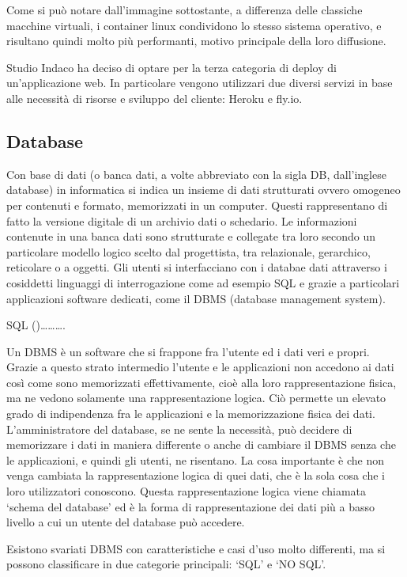 \documentclass[12pt,a4paper]{article}
\begin{document}
Come si può notare dall’immagine sottostante, a differenza delle classiche macchine virtuali, i container linux condividono lo stesso sistema operativo, e risultano quindi molto più performanti, motivo principale della loro diffusione.

Studio Indaco ha deciso di optare per la terza categoria di deploy di un’applicazione web. In particolare vengono utilizzari due diversi servizi in base alle necessità di risorse e sviluppo del cliente: Heroku e fly.io.

\subsection{Database}
Con base di dati (o banca dati, a volte abbreviato con la sigla DB, dall'inglese database) in informatica si indica un insieme di dati strutturati ovvero omogeneo per contenuti e formato, memorizzati in un computer. Questi rappresentano di fatto la versione digitale di un archivio dati o schedario.
Le informazioni contenute in una banca dati sono strutturate e collegate tra loro secondo un particolare modello logico scelto dal progettista, tra relazionale, gerarchico, reticolare o a oggetti. Gli utenti si interfacciano con i databae dati attraverso i cosiddetti linguaggi di interrogazione come ad esempio SQL e grazie a particolari applicazioni software dedicati, come il DBMS (database management system).

SQL ()……….

Un DBMS è un software che si frappone fra l’utente ed i dati veri e propri. Grazie a questo strato intermedio l’utente e le applicazioni non accedono ai dati così come sono memorizzati effettivamente, cioè alla loro rappresentazione fisica, ma ne vedono solamente una rappresentazione logica. Ciò permette un elevato grado di indipendenza fra le applicazioni e la memorizzazione fisica dei dati. L’amministratore del database, se ne sente la necessità, può decidere di memorizzare i dati in maniera differente o anche di cambiare il DBMS senza che le applicazioni, e quindi gli utenti, ne risentano. La cosa importante è che non venga cambiata la rappresentazione logica di quei dati, che è la sola cosa che i loro utilizzatori conoscono. Questa rappresentazione logica viene chiamata ‘schema del database’ ed è la forma di rappresentazione dei dati più a basso livello a cui un utente del database può accedere.

Esistono svariati DBMS con caratteristiche e casi d’uso molto differenti, ma si possono classificare in due categorie principali: ‘SQL’ e ‘NO SQL’.
\end{document}
